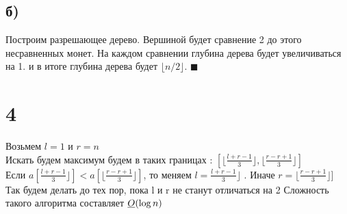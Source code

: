 	\subsection*{б)}
	Построим разрешающее дерево. Вершиной будет сравнение 2 до этого несравненных монет. На каждом сравнении глубина дерева будет увеличиваться на 1. и в итоге глубина дерева будет  $\lfloor n/2 \rfloor$. $\blacksquare$
	\section*{4}
	Возьмем $l  =1$ и $r = n$ \\
	Искать будем максимум будем в таких границах : $[ \lfloor \frac{l+r-1}{3}\rfloor, \lfloor \frac{r-r+1}{3}\rfloor] $ \\
	Если $a[\frac{l+r-1}{3}\rfloor] < a[ \lfloor \frac{r-r+1}{3}\rfloor]$, то 	меняем  $l  =\frac{l+r-1}{3}\rfloor $ . Иначе $r = \lfloor \frac{r-r+1}{3}\rfloor]$\\
Так будем делать до тех пор, пока l и r не станут отличаться на 2  Сложность такого алгоритма составляет $\underline{O}(\log n)$
	